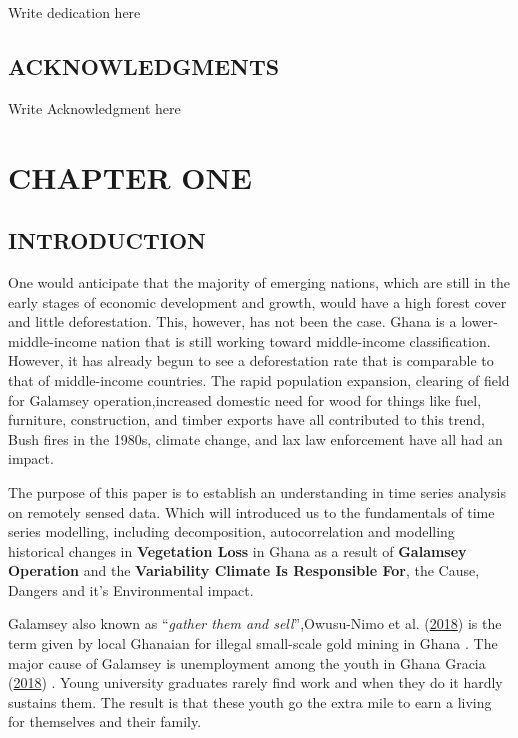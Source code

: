 \documentclass[12pt,a4paper]{book}
\begin{document}
{	Write dedication here   
	\newpage	
	\begin{center}\section*{ACKNOWLEDGMENTS}\end{center}
	
	Write Acknowledgment here
	
	\newpage
	


	\hypertarget{chapter-one}{%
\chapter{CHAPTER ONE}\label{chapter-one}}

\hypertarget{introduction}{%
\section{INTRODUCTION}\label{introduction}}

One would anticipate that the majority of emerging nations, which are
still in the early stages of economic development and growth, would have
a high forest cover and little deforestation. This, however, has not
been the case. Ghana is a lower-middle-income nation that is still
working toward middle-income classification. However, it has already
begun to see a deforestation rate that is comparable to that of
middle-income countries. The rapid population expansion, clearing of
field for Galamsey operation,increased domestic need for wood for things
like fuel, furniture, construction, and timber exports have all
contributed to this trend, Bush fires in the 1980s, climate change, and
lax law enforcement have all had an impact.

The purpose of this paper is to establish an understanding in time
series analysis on remotely sensed data. Which will introduced us to the
fundamentals of time series modelling, including decomposition,
autocorrelation and modelling historical changes in \textbf{Vegetation
Loss} in Ghana as a result of \textbf{Galamsey Operation} and the
\textbf{Variability Climate Is Responsible For}, the Cause, Dangers and
it's Environmental impact.

Galamsey also known as ``\emph{gather them and sell}'',Owusu-Nimo et al.
(\protect\hyperlink{ref-owusu-nimo2018}{2018}) is the term given by
local Ghanaian for illegal small-scale gold mining in Ghana . The major
cause of Galamsey is unemployment among the youth in Ghana Gracia
(\protect\hyperlink{ref-gracia2018}{2018}) . Young university graduates
rarely find work and when they do it hardly sustains them. The result is
that these youth go the extra mile to earn a living for themselves and
their family.

}
\end{document}
